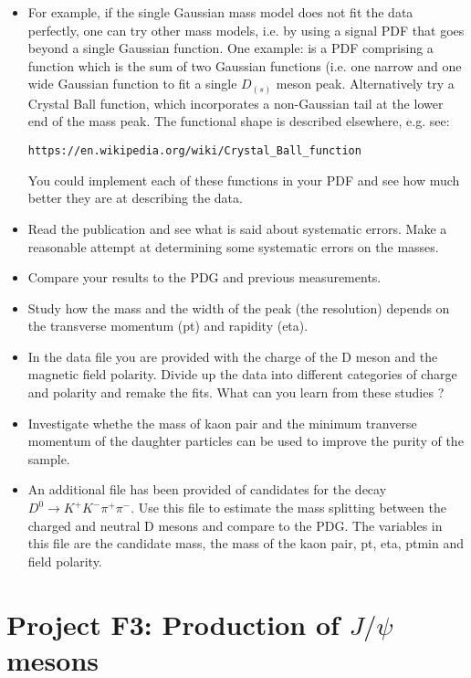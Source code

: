 \begin{enumerate}
\begin{itemize} 
\item For example, if the single
Gaussian mass model does not fit the data perfectly, one can try other mass models,
i.e. by using a signal PDF that goes beyond a single Gaussian
function. One example: is a PDF comprising a function which is the sum of two Gaussian functions (i.e. one
narrow and one wide Gaussian function to fit a single $D_{(s)}$ meson
peak. Alternatively try a Crystal Ball function, which incorporates a non-Gaussian tail at the lower end of
the mass peak. The functional shape is described elsewhere, e.g. see:
\begin{verbatim}
https://en.wikipedia.org/wiki/Crystal_Ball_function 
\end{verbatim} 
You could implement each of these functions in your PDF and see how much better
they are at describing the data.
\item Read the publication and see what is said about systematic errors. Make a reasonable
attempt at determining some systematic errors on the masses.
\item Compare your results to the PDG and previous measurements.
\item Study how the mass and the width of the peak (the resolution)
  depends on the transverse momentum (pt) and rapidity (eta).
\item In the data file you are provided with the charge of the D meson and the magnetic field polarity. Divide up the data into different categories of charge and polarity and remake the fits. What can you learn from these studies ?
\item Investigate whethe the mass of kaon pair and the minimum tranverse momentum of the
 daughter particles can be used to improve the purity of the sample.
\item An additional file has been provided of candidates for the decay $D^0 \rightarrow K^+ K^- \pi^+ \pi^-$. Use this file to estimate the mass splitting between the charged and neutral D mesons and compare to the PDG. The variables in this file are the candidate mass, the mass of the kaon pair, pt, eta, ptmin and field polarity.
\end{itemize}



\end{enumerate}

 

\newpage
\section{Project F3: Production of $J/\psi$ mesons}

